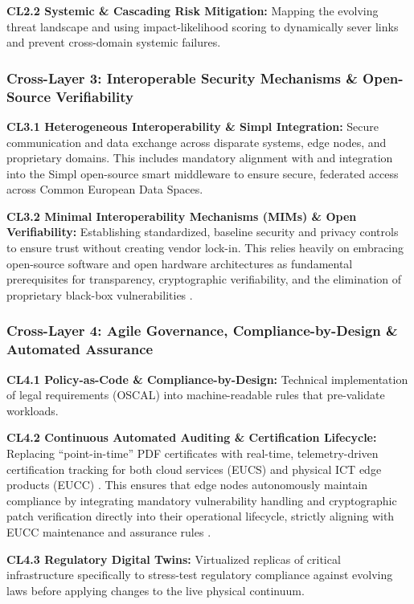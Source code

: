 \documentclass[12pt,a4paper]{article}
\begin{document}
\textbf{CL2.2 Systemic \& Cascading Risk Mitigation:} Mapping the evolving threat landscape and using impact-likelihood scoring to dynamically sever links and prevent cross-domain systemic failures.

\subsubsection*{Cross-Layer 3: Interoperable Security Mechanisms \& Open-Source Verifiability}
\textbf{CL3.1 Heterogeneous Interoperability \& Simpl Integration:} Secure communication and data exchange across disparate systems, edge nodes, and proprietary domains. This includes mandatory alignment with and integration into the Simpl open-source smart middleware \cite{cloud_edge_roadmap} to ensure secure, federated access across Common European Data Spaces.

\textbf{CL3.2 Minimal Interoperability Mechanisms (MIMs) \& Open Verifiability:} Establishing standardized, baseline security and privacy controls to ensure trust without creating vendor lock-in. This relies heavily on embracing open-source software and open hardware architectures as fundamental prerequisites for transparency, cryptographic verifiability, and the elimination of proprietary black-box vulnerabilities \cite{cloud_edge_roadmap}.

\subsubsection*{Cross-Layer 4: Agile Governance, Compliance-by-Design \& Automated Assurance}
\textbf{CL4.1 Policy-as-Code \& Compliance-by-Design:} Technical implementation of legal requirements (OSCAL) into machine-readable rules that pre-validate workloads.

\textbf{CL4.2 Continuous Automated Auditing \& Certification Lifecycle:} Replacing ``point-in-time'' PDF certificates with real-time, telemetry-driven certification tracking for both cloud services (EUCS) \cite{eucs} and physical ICT edge products (EUCC) \cite{eucc}. This ensures that edge nodes autonomously maintain compliance by integrating mandatory vulnerability handling and cryptographic patch verification directly into their operational lifecycle, strictly aligning with EUCC maintenance and assurance rules \cite{eucc}.

\textbf{CL4.3 Regulatory Digital Twins:} Virtualized replicas of critical infrastructure specifically to stress-test regulatory compliance against evolving laws before applying changes to the live physical continuum.
\end{document}
